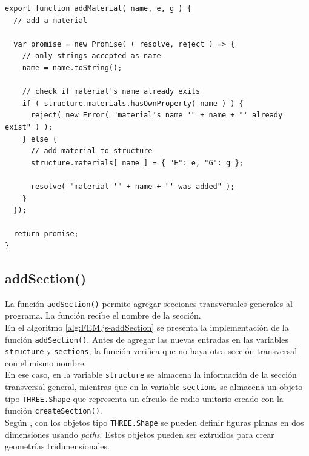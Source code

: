 \begin{lstlisting}[language={},caption=Función \texttt{addMaterial()} implementada en el archivo \texttt{FEM.js}.,label=alg:FEM.js-addMaterial, frame=single]
export function addMaterial( name, e, g ) {
  // add a material

  var promise = new Promise( ( resolve, reject ) => {
    // only strings accepted as name
    name = name.toString();

    // check if material's name already exits
    if ( structure.materials.hasOwnProperty( name ) ) {
      reject( new Error( "material's name '" + name + "' already exist" ) );
    } else {
      // add material to structure
      structure.materials[ name ] = { "E": e, "G": g };

      resolve( "material '" + name + "' was added" );
    }
  });

  return promise;
}
\end{lstlisting}

\subsection{addSection()}

La función \verb|addSection()| permite agregar secciones transversales generales al programa. La función recibe el nombre de la sección.\\

En el algoritmo \ref{alg:FEM.js-addSection} se presenta la implementación de la función \verb|addSection()|. Antes de agregar las nuevas entradas en las variables \verb|structure| y \verb|sections|, la función verifica que no haya otra sección transversal con el mismo nombre.\\

En ese caso, en la variable \verb|structure| se almacena la información de la sección transversal general, mientras que en la variable \verb|sections| se almacena un objeto tipo \verb|THREE.Shape| que representa un círculo de radio unitario creado con la función \verb|createSection()|.\\

Según \cite{threejs-Shape}, con los objetos tipo \verb|THREE.Shape| se pueden definir figuras planas en dos dimensiones usando \emph{paths}. Estos objetos pueden ser extrudios para crear geometrías tridimensionales.\\


